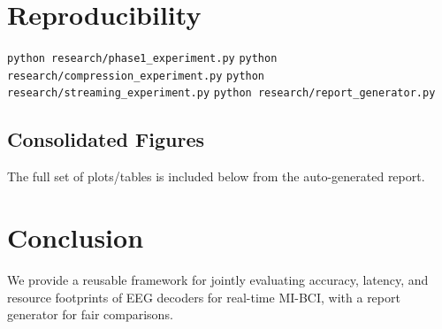 ﻿\documentclass[conference]{IEEEtran}
\begin{document}
\section{Reproducibility}
\verb|python research/phase1_experiment.py|
\verb|python research/compression_experiment.py|
\verb|python research/streaming_experiment.py|
\verb|python research/report_generator.py|

\subsection{Consolidated Figures}
The full set of plots/tables is included below from the auto-generated report.


\section{Conclusion}
We provide a reusable framework for jointly evaluating accuracy, latency, and resource footprints of EEG decoders for real-time MI-BCI, with a report generator for fair comparisons.


\end{document}
